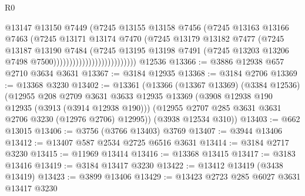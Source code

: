 \begin{lexlean}{R0}
\begin{coremodule}
                                          @13147
                                          @13150
                                          @7449
                                          (@7245
                                            @13155
                                            @13158
                                            @7456
                                            (@7245
                                              @13163
                                              @13166
                                              @7463
                                              (@7245
                                                @13171
                                                @13174
                                                @7470
                                                (@7245
                                                  @13179
                                                  @13182
                                                  @7477
                                                  (@7245
                                                    @13187
                                                    @13190
                                                    @7484
                                                    (@7245
                                                      @13195
                                                      @13198
                                                      @7491
                                                      (@7245
                                                        @13203
                                                        @13206
                                                        @7498
                                                        @7500))))))))))))))))))))))))))
    @12536
@13366 := @3886 @12938 @657 @2710 @3634 @3631
@13367 := @3184 @12935
@13368 := @3184 @2706
@13369 := @13368 @3230
@13402 := @13361
    (@13366
      (@13367 @13369)
      (@3384 @12536)
      (@12955
        @208
        @2709
        @3631
        @3633
        @12935
        @13369
        (@3908 @12938 @190 @12935 (@3913 (@3914 @12938 @190)))
        (@12955 @2707 @285 @3631 @3631 @2706 @3230 (@12976 @2706) @12995))
      (@3938 @12534 @310))
@13403 := @662 @13015
@13406 := @3756 (@3766 @13403) @3769
@13407 := @3944 @13406
@13412 := @13407 @587 @2534 @2725 @6516 @3631
@13414 := @3184 @2717 @3230
@13415 := @11969 @13414
@13416 := @13368 @13415
@13417 := @3183 @13416
@13419 := @3184 @13417 @3230
@13422 := @13412 @13419 (@3438 @13419)
@13423 := @3899 @13406
@13429 := @13423 @2723 @285 @6027 @3631 @13417 @3230

\end{coremodule}
\end{lexlean}
